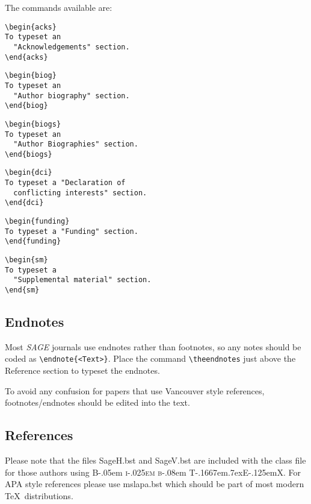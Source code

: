 \documentclass[Afour,sageh,times]{sagej}
\newcommand\BibTeX{{\rmfamily B\kern-.05em \textsc{i\kern-.025em b}\kern-.08em
T\kern-.1667em\lower.7ex\hbox{E}\kern-.125emX}}
\begin{document}
The commands available are:
\begin{verbatim}
\begin{acks}
To typeset an
  "Acknowledgements" section.
\end{acks}
\end{verbatim}
\begin{verbatim}
\begin{biog}
To typeset an
  "Author biography" section.
\end{biog}
\end{verbatim}
\begin{verbatim}
\begin{biogs}
To typeset an
  "Author Biographies" section.
\end{biogs}
\end{verbatim}
\begin{verbatim}
\begin{dci}
To typeset a "Declaration of
  conflicting interests" section.
\end{dci}
\end{verbatim}
\begin{verbatim}
\begin{funding}
To typeset a "Funding" section.
\end{funding}
\end{verbatim}
\begin{verbatim}
\begin{sm}
To typeset a
  "Supplemental material" section.
\end{sm}
\end{verbatim}

\subsection{Endnotes}
Most \textit{SAGE} journals use endnotes rather than footnotes, so any notes should be coded as \verb+\endnote{<Text>}+.
Place the command \verb+\theendnotes+ just above the Reference section to typeset the endnotes.

To avoid any confusion for papers that use Vancouver style references,  footnotes/endnotes should be edited into the text.

\subsection{References}
Please note that the files \textsf{SageH.bst} and \textsf{SageV.bst} are included with the class file
for those authors using \BibTeX. For APA style references please use \textsf{mslapa.bst} which should be part of most modern \TeX\ distributions.
\end{document}
